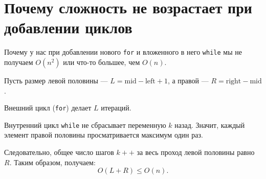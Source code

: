\documentclass[12pt]{article}
\begin{document}
\bigskip

\section*{Почему сложность не возрастает при добавлении циклов}

Почему у нас при добавлении нового \texttt{for} и вложенного в него \texttt{while} мы не получаем $O(n^2)$  
или что-то большее, чем $O(n)$.

Пусть размер левой половины — \( L = \text{mid} - \text{left} + 1 \),  
а правой — \( R = \text{right} - \text{mid} \).

Внешний цикл (\texttt{for}) делает \( L \) итераций.  

Внутренний цикл \texttt{while} не сбрасывает переменную \( k \) назад.  
Значит, каждый элемент правой половины просматривается максимум один раз.

Следовательно, общее число шагов \( k++ \) за весь проход левой половины равно \( R \).  
Таким образом, получаем:
\[
O(L + R) \le O(n).
\]
\end{document}
